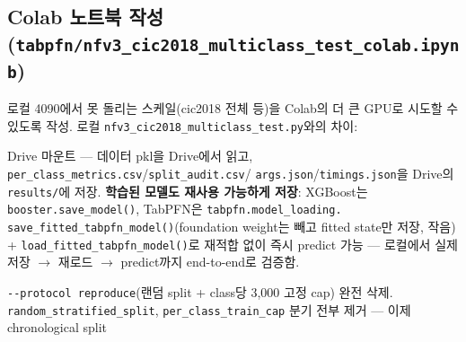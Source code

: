 \subsection{Colab 노트북 작성 (\texttt{tabpfn/\allowbreak{}\allowbreak{}n\allowbreak{}fv3\_\allowbreak{}\allowbreak{}cic2\allowbreak{}018\_\allowbreak{}\allowbreak{}mult\allowbreak{}iclass\_\allowbreak{}\allowbreak{}t\allowbreak{}est\_\allowbreak{}\allowbreak{}cola\allowbreak{}b.\allowbreak{}ipynb})}
로컬 4090에서 못 돌리는 스케일(cic2018 전체 등)을 Colab의 더 큰 GPU로 시도할 수 있도록 작성. 로컬 \texttt{nfv3\_\allowbreak{}\allowbreak{}cic\allowbreak{}2018\_\allowbreak{}\allowbreak{}mul\allowbreak{}ticlass\_\allowbreak{}\allowbreak{}test.\allowbreak{}py}와의 차이:

\par\noindent \textbullet\enspace Drive 마운트 — 데이터 pkl을 Drive에서 읽고, \texttt{per\_\allowbreak{}\allowbreak{}clas\allowbreak{}s\_\allowbreak{}\allowbreak{}metric\allowbreak{}s.\allowbreak{}csv}/\allowbreak{}\texttt{split\_\allowbreak{}\allowbreak{}au\allowbreak{}dit.\allowbreak{}csv}/\allowbreak{} \texttt{args.\allowbreak{}jso\allowbreak{}n}/\allowbreak{}\texttt{timings.\allowbreak{}json}을 Drive의 \texttt{results/\allowbreak{}\allowbreak{}}에 저장. \textbf{학습된 모델도 재사용 가능하게 저장}: XGBoost는 \texttt{booster.\allowbreak{}save\_\allowbreak{}\allowbreak{}mod\allowbreak{}el()}, TabPFN은 \texttt{tabpfn.\allowbreak{}m\allowbreak{}odel\_\allowbreak{}\allowbreak{}loa\allowbreak{}ding.\allowbreak{} sa\allowbreak{}ve\_\allowbreak{}\allowbreak{}fitte\allowbreak{}d\_\allowbreak{}\allowbreak{}tabpfn\allowbreak{}\_\allowbreak{}\allowbreak{}model()\allowbreak{}}(foundation weight는 빼고 fitted state만 저장, 작음) +\allowbreak{} \texttt{load\_\allowbreak{}\allowbreak{}fit\allowbreak{}ted\_\allowbreak{}\allowbreak{}tabp\allowbreak{}fn\_\allowbreak{}\allowbreak{}model\allowbreak{}()}로 재적합 없이 즉시 predict 가능 — 로컬에서 실제 저장 \ensuremath{\rightarrow} 재로드 \ensuremath{\rightarrow}  predict까지 end-to-end로 검증함.


\par\noindent \textbullet\enspace \texttt{-\allowbreak{}-\allowbreak{}protoc\allowbreak{}ol repro\allowbreak{}duce}(랜덤 split +\allowbreak{} class당 3,000 고정 cap) 완전 삭제. \texttt{random\_\allowbreak{}\allowbreak{}s\allowbreak{}tratifie\allowbreak{}d\_\allowbreak{}\allowbreak{}split}, \texttt{per\_\allowbreak{}\allowbreak{}clas\allowbreak{}s\_\allowbreak{}\allowbreak{}train\_\allowbreak{}\allowbreak{}cap} 분기 전부 제거 — 이제 chronological split

